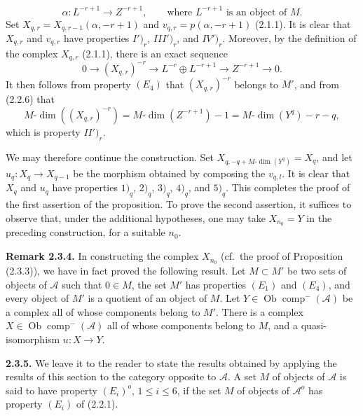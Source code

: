 \clearpage
{}%
\begingroup\small\setlength{\parskip}{0pt}\setlength{\emergencystretch}{1.5em}
\setlength{\abovedisplayskip}{4pt plus 2pt minus 2pt}%
\setlength{\belowdisplayskip}{4pt plus 2pt minus 2pt}%

\[
\alpha\colon L^{-r+1}\longrightarrow Z^{-r+1},
\qquad\text{where }L^{-r+1}\text{ is an object of }M.
\]
Set $X_{q,r}=X_{q,r-1}(\alpha,-r+1)$ and
$v_{q,r}=p(\alpha,-r+1)$ (2.1.1). It is clear that $X_{q,r}$ and
$v_{q,r}$ have properties $I')_r$, $III')_r$, and
$IV')_r$. Moreover, by the definition of the complex $X_{q,r}$
(2.1.1), there is an exact sequence
\[
0\longrightarrow (X_{q,r})^{-r}\longrightarrow
L^{-r}\oplus L^{-r+1}\longrightarrow Z^{-r+1}\longrightarrow0.
\]
It then follows from property $(E_4)$ that $(X_{q,r})^{-r}$ belongs to
$M'$, and from (2.2.6) that
\[
M\text{-}\dim((X_{q,r})^{-r})
=M\text{-}\dim(Z^{-r+1})-1
=M\text{-}\dim(Y^q)-r-q,
\]
which is property $II')_r$.

We may therefore continue the construction. Set
$X_{q,-q+M\text{-}\dim(Y^q)}=X_q$, and let
$u_q\colon X_q\longrightarrow X_{q-1}$ be the morphism obtained by
composing the $v_{q,l}$. It is clear that $X_q$ and $u_q$ have properties
$1)_q$, $2)_q$, $3)_q$, $4)_q$, and $5)_q$. This completes the proof of
the first assertion of the proposition. To prove the second assertion, it
suffices to observe that, under the additional hypotheses, one may take
$X_{n_0}=Y$ in the preceding construction, for a suitable $n_0$.

\medskip\noindent\textbf{Remark 2.3.4.}\quad
In constructing the complex $X_{n_0}$ (cf.\ the proof of Proposition
(2.3.3)), we have in fact proved the following result. Let $M\subset M'$
be two sets of objects of $\mathcal A$ such that $0\in M$, the set $M'$
has properties $(E_1)$ and $(E_4)$, and every object of $M'$ is a quotient
of an object of $M$. Let
$Y\in\operatorname{Ob}\operatorname{comp}^{-}(\mathcal A)$ be a complex
all of whose components belong to $M'$. There is a complex
$X\in\operatorname{Ob}\operatorname{comp}^{-}(\mathcal A)$ all of whose
components belong to $M$, and a quasi-isomorphism
$u\colon X\longrightarrow Y$.

\medskip\noindent\textbf{2.3.5.}\quad
We leave it to the reader to state the results obtained by applying the
results of this section to the category opposite to $\mathcal A$. A set
$M$ of objects of $\mathcal A$ is said to have property $(E_i)^o$,
$1\leq i\leq6$, if the set $M$ of objects of $\mathcal A^o$ has property
$(E_i)$ of (2.2.1).

